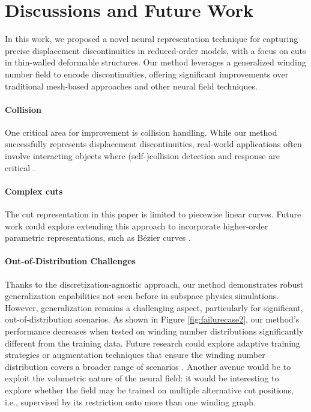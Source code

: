 \section{Discussions and Future Work}
In this work, we proposed a novel neural representation technique for capturing precise displacement discontinuities in reduced-order models, with a focus on cuts in thin-walled deformable structures. Our method leverages a generalized winding number field to encode discontinuities, offering significant improvements over traditional mesh-based approaches and other neural field techniques.

\paragraph{Collision} One critical area for improvement is collision handling. While our method successfully represents displacement discontinuities, real-world applications often involve interacting objects where (self-)collision detection and response are critical \cite{zesch2023neural}.

\paragraph{Complex cuts} The cut representation in this paper is limited to piecewise linear curves. Future work could explore extending this approach to incorporate higher-order parametric representations, such as Bézier curves \cite{Spainhour2024_arxiv}.

\paragraph{Out-of-Distribution Challenges} Thanks to the discretization-agnostic approach, our method demonstrates robust generalization capabilities not seen before in subspace physics simulations. However, generalization remains a challenging aspect, particularly for significant, out-of-distribution scenarios. As shown in Figure \ref{fig:failurecase2}, our method's performance decreases when tested on winding number distributions significantly different from the training data. Future research could explore adaptive training strategies or augmentation techniques that ensure the winding number distribution covers a broader range of scenarios \cite{grangier2023adaptive}. Another avenue would be to exploit the volumetric nature of the neural field: it would be interesting to explore whether the field may be trained on multiple alternative cut positions, i.e., supervised by its restriction onto more than one winding graph.


